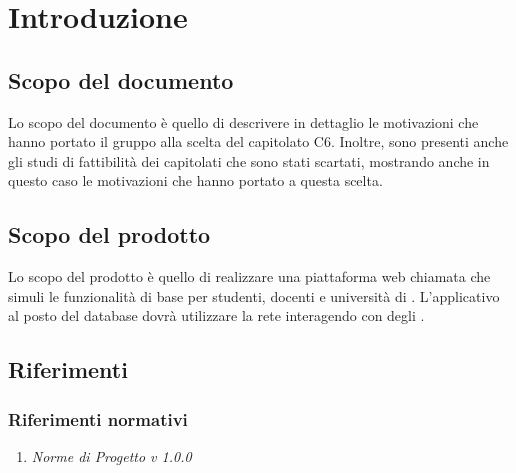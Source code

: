 \documentclass[StudioDiFattibilità.tex]{subfiles}
\begin{document}
\chapter{Introduzione}
\section{Scopo del documento}
Lo scopo del documento è quello di descrivere in dettaglio le motivazioni che hanno portato il gruppo alla scelta del capitolato C6. Inoltre, sono presenti anche gli studi di fattibilità dei capitolati che sono stati scartati, mostrando anche in questo caso le motivazioni che hanno portato a questa scelta.
\section{Scopo del prodotto}
Lo scopo del prodotto è quello di realizzare una piattaforma web chiamata \progetto che simuli le funzionalità di base per studenti, docenti e università di . L'applicativo al posto del database dovrà utilizzare la rete  interagendo con degli .

\glossExpl

\section{Riferimenti}
\subsection{Riferimenti normativi}
\begin{enumerate}
	\item \textit{Norme di Progetto v 1.0.0}
\end{enumerate}
\end{document}
